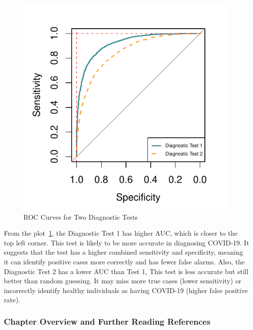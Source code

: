 \documentclass{article}\usepackage[]{graphicx}\usepackage[]{xcolor}
\makeatletter
\def\maxwidth{ %
  \ifdim\Gin@nat@width>\linewidth
    \linewidth
  \else
    \Gin@nat@width
  \fi
}
\newenvironment{knitrout}{}{} %
\numberwithin{equation}{section}
\makeatother
\begin{document}
\begin{knitrout}\scriptsize
{}\color{fgcolor}\begin{figure}[H]

{\centering \includegraphics[width=\maxwidth]{figure/beamer-roc-1} 

}

\caption[ROC Curves for Two Diagnostic Tests]{ROC Curves for Two Diagnostic Tests}\label{fig:roc}
\end{figure}

\end{knitrout}

\noindent
From the plot~\ref{fig:roc}, the Diagnostic Test 1 has higher AUC, which is closer to the top left corner. This test is likely to be more accurate in diagnosing COVID-19. It suggests that the test has a higher combined sensitivity and specificity, meaning it can identify positive cases more correctly and has fewer false alarms. Also, the Diagnostic Test 2 has a lower AUC than Test 1, This test is less accurate but still better than random guessing. It may miss more true cases (lower sensitivity) or incorrectly identify healthy individuals as having COVID-19 (higher false positive rate).

\subsubsection*{Chapter Overview and Further Reading References}
\end{document}
